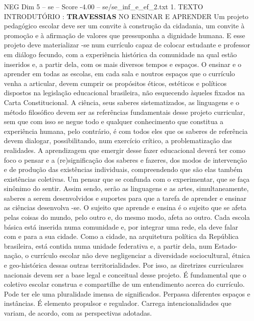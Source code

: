 \begin{textsample}{NEG Dim 5 – se – Score -4.00 – se/se\_inf\_e\_ef\_2.txt}  \label{ex:f5_neg_151}
1.
TEXTO INTRODUTÓRIO : \textbf{TRAVESSIAS} NO ENSINAR E APRENDER Um projeto pedagógico escolar deve ser um convite à construção da cidadania, um convite à promoção e à afirmação de valores que pressuponha a dignidade humana.
E esse projeto deve materializar -se num currículo capaz de colocar estudante e professor em diálogo fecundo, com a experiência histórica da comunidade na qual estão inseridos e, a partir dela, com os mais diversos tempos e espaços.
O ensinar e o aprender em todas as escolas, em cada sala e noutros espaços que o currículo venha a articular, devem cumprir os propósitos éticos, estéticos e políticos dispostos na legislação educacional brasileira, não esquecendo àqueles fixados na Carta Constitucional.
A ciência, seus saberes sistematizados, as linguagens e o método filosófico devem ser as referências fundamentais desse projeto curricular, sem que com isso se negue todo e qualquer conhecimento que constitua a experiência humana, pelo contrário, é com todos eles que os saberes de referência devem dialogar, possibilitando, num exercício crítico, a problematização das realidades.
A aprendizagem que emergir desse fazer educacional deverá ter como foco o pensar e a (re)significação dos saberes e fazeres, dos modos de intervenção e de produção das existências individuais, compreendendo que são elas também existências coletivas.
Um pensar que se confunda com o experimentar, que se faça sinônimo do sentir.
Assim sendo, serão as linguagens e as artes, simultaneamente, saberes a serem desenvolvidos e suportes para que a tarefa de aprender e ensinar as ciências desenvolva -se.
O sujeito que aprende e ensina é o sujeito que se afeta pelas coisas do mundo, pelo outro e, do mesmo modo, afeta ao outro.
Cada escola básica está inserida numa comunidade e, por integrar uma rede, ela deve falar com e para a sua cidade.
Como a cidade, na arquitetura política da República brasileira, está contida numa unidade federativa e, a partir dela, num Estado-nação, o currículo escolar não deve negligenciar a diversidade sociocultural, étnica e geo-histórica dessas outras territorialidades.
Por isso, as diretrizes curriculares nacionais devem ser a base legal e conceitual desse projeto.
É fundamental que o coletivo escolar construa e compartilhe de um entendimento acerca do currículo.
Pode ter ele uma pluralidade imensa de significados.
Perpassa diferentes espaços e instâncias.
É elemento propulsor e regulador.
Carrega intencionalidades que variam, de acordo, com as perspectivas adotadas.

\end{textsample}

